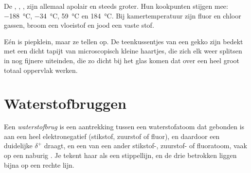 \begin{example}[De halogenen]\label{ex:g11:polarity-and-cohesion:halogens}
De  , , ,  zijn allemaal apolair
en steeds groter. Hun kookpunten stijgen mee:
\qty{-188}{\celsius}, \qty{-34}{\celsius}, \qty{59}{\celsius} en
\qty{184}{\celsius}. Bij kamertemperatuur zijn fluor en chloor gassen,
broom een vloeistof en jood een vaste stof.
\end{example}

\begin{remark}[De gekko]\label{rem:g11:polarity-and-cohesion:gecko}
Eén  is piepklein, maar ze tellen op. De
teenkussentjes van een gekko zijn bedekt met een dicht tapijt van
microscopisch kleine haartjes, die zich elk weer splitsen in nog fijnere
uiteinden, die zo dicht bij het glas komen dat  over
een heel groot totaal oppervlak werken.
\end{remark}

\section{Waterstofbruggen}

\begin{definition}[Waterstofbrug]\label{def:g11:polarity-and-cohesion:hydrogen-bond}
Een \emph{waterstofbrug} is een aantrekking tussen
een waterstofatoom dat gebonden is aan een heel elektronegatief 
(stikstof, zuurstof of fluor), en daardoor een duidelijke $\delta^+$
draagt, en een  van een ander stikstof-, zuurstof- of
fluoratoom, vaak op een naburig . Je tekent haar als een
stippellijn, en de drie betrokken  liggen bijna op een rechte lijn.
\end{definition}

